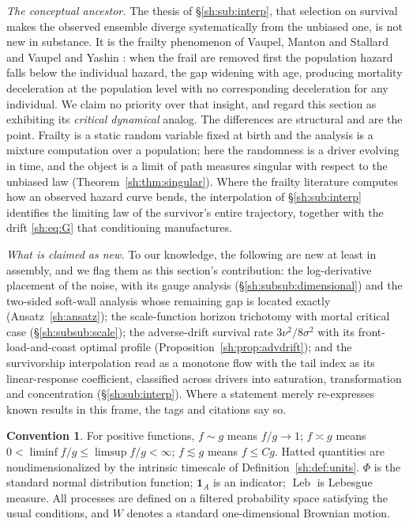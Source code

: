 \documentclass[11pt]{article}
\numberwithin{equation}{section}
\theoremstyle{plain}
\theoremstyle{definition}
\newtheorem{convention}[theorem]{Convention}
\theoremstyle{remark}
\DeclareMathOperator{\Leb}{Leb}
\newcommand{\one}{\mathbf{1}}
\begin{document}
\emph{The conceptual ancestor.} The thesis of \S\ref{sh:sub:interp}, that selection on survival makes the observed ensemble diverge
systematically from the unbiased one, is not new in substance. It is
the frailty phenomenon of Vaupel, Manton and Stallard \cite{VMS79} and
Vaupel and Yashin \cite{VY85}: when the frail are removed first the
population hazard falls below the individual hazard, the gap widening
with age, producing mortality deceleration at the population level with
no corresponding deceleration for any individual. We claim no priority
over that insight, and regard this section as exhibiting its
\emph{critical dynamical} analog. The differences are structural and
are the point. Frailty is a static random variable fixed at birth and the
analysis is a mixture computation over a population; here the randomness
is a driver evolving in time, and the object is a limit of path measures
singular with respect to the unbiased law
(Theorem~\ref{sh:thm:singular}). Where the frailty literature computes
how an observed hazard curve bends, the interpolation of
\S\ref{sh:sub:interp} identifies the limiting law of the survivor's
entire trajectory, together with the drift \eqref{sh:eq:G} that
conditioning manufactures.

\emph{What is claimed as new.} To our knowledge, the following are new
at least in assembly, and we flag them as this section's contribution:
the log-derivative placement of the noise, with its gauge analysis
(\S\ref{sh:subsub:dimensional}) and the two-sided soft-wall analysis
whose remaining gap is located exactly (Ansatz~\ref{sh:ansatz}); the
scale-function horizon trichotomy with mortal critical case
(\S\ref{sh:subsub:scale}); the adverse-drift survival rate
$3\nu^2/8\sigma^2$ with its front-load-and-coast optimal profile
(Proposition~\ref{sh:prop:advdrift}); and the survivorship
interpolation read as a monotone flow with the tail index as its
linear-response coefficient, classified across drivers into saturation,
transformation and concentration (\S\ref{sh:sub:interp}). Where a
statement merely re-expresses known results in this frame, the tags and
citations say so.

\begin{convention}\label{sh:conv}
For positive functions, $f\sim g$ means $f/g\to1$; $f\asymp g$ means
$0<\liminf f/g\le\limsup f/g<\infty$; $f\lesssim g$ means $f\le Cg$.
Hatted quantities are nondimensionalized by the intrinsic timescale of
Definition~\ref{sh:def:units}. $\Phi$ is the standard normal distribution
function; $\one_A$ is an indicator; $\Leb$ is Lebesgue measure. All processes
are defined on a filtered probability space satisfying the usual conditions,
and $W$ denotes a standard one-dimensional Brownian motion.
\end{convention}
\end{document}
